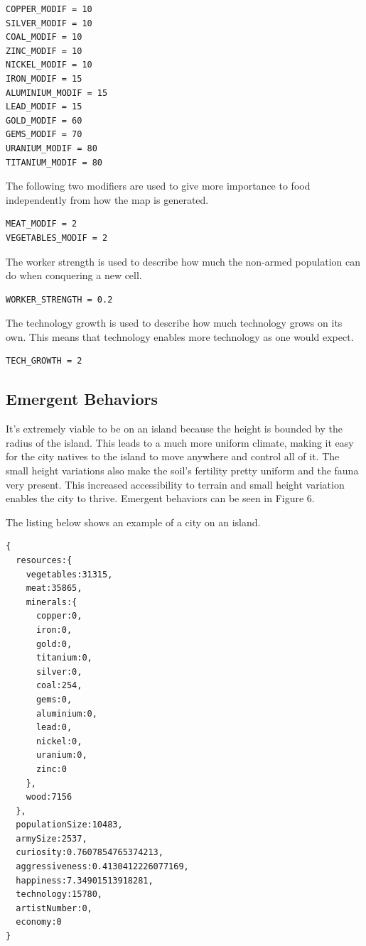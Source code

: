 \begin{lstlisting}
COPPER_MODIF = 10
SILVER_MODIF = 10
COAL_MODIF = 10
ZINC_MODIF = 10
NICKEL_MODIF = 10
IRON_MODIF = 15
ALUMINIUM_MODIF = 15
LEAD_MODIF = 15
GOLD_MODIF = 60
GEMS_MODIF = 70
URANIUM_MODIF = 80
TITANIUM_MODIF = 80
\end{lstlisting}

The following two modifiers are used to give more importance to food independently from how the map is generated.

\begin{lstlisting}
MEAT_MODIF = 2
VEGETABLES_MODIF = 2
\end{lstlisting}

The worker strength is used to describe how much the non-armed population can do when conquering a new cell.
\begin{lstlisting}
WORKER_STRENGTH = 0.2
\end{lstlisting}

The technology growth is used to describe how much technology grows on its own. This means that technology enables more technology as one would expect.
\begin{lstlisting}
TECH_GROWTH = 2
\end{lstlisting}

\subsection{Emergent Behaviors}
It's extremely viable to be on an island because the height is bounded by the radius of the island. This leads to a much more uniform climate, making it easy for the city natives to the island to move anywhere and control all of it. The small height variations also make the soil's fertility pretty uniform and the fauna very present. This increased accessibility to terrain and small height variation enables the city to thrive. Emergent behaviors can be seen in Figure 6.

The listing below shows an example of a city on an island.

\begin{lstlisting}
{
  resources:{
    vegetables:31315,
    meat:35865,
    minerals:{
      copper:0,
      iron:0,
      gold:0,
      titanium:0,
      silver:0,
      coal:254,
      gems:0,
      aluminium:0,
      lead:0,
      nickel:0,
      uranium:0,
      zinc:0
    },
    wood:7156
  },
  populationSize:10483,
  armySize:2537,
  curiosity:0.7607854765374213,
  aggressiveness:0.4130412226077169,
  happiness:7.34901513918281,
  technology:15780,
  artistNumber:0,
  economy:0
}
\end{lstlisting}

